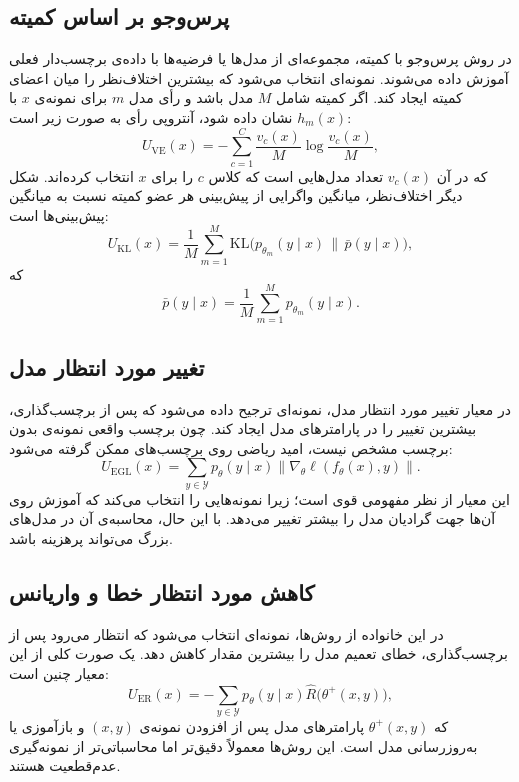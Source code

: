 \documentclass[12pt,a4paper,oneside]{report}
\newcommand{\cY}{\mathcal{Y}}
\newcommand{\KL}{\mathrm{KL}}
\begin{document}
\subsection{پرس‌وجو بر اساس کمیته}
در روش پرس‌وجو با کمیته، مجموعه‌ای از مدل‌ها یا فرضیه‌ها با داده‌ی برچسب‌دار فعلی آموزش داده می‌شوند. نمونه‌ای انتخاب می‌شود که بیشترین اختلاف‌نظر را میان اعضای کمیته ایجاد کند. اگر کمیته شامل $M$ مدل باشد و رأی مدل $m$ برای نمونه‌ی $x$ با $h_m(x)$ نشان داده شود، آنتروپی رأی به صورت زیر است:
\begin{equation}
U_{\mathrm{VE}}(x)= -\sum_{c=1}^{C}\frac{v_c(x)}{M}\log\frac{v_c(x)}{M},
\end{equation}
که در آن $v_c(x)$ تعداد مدل‌هایی است که کلاس $c$ را برای $x$ انتخاب کرده‌اند. شکل دیگر اختلاف‌نظر، میانگین واگرایی  از پیش‌بینی هر عضو کمیته نسبت به میانگین پیش‌بینی‌ها است:
\begin{equation}
U_{\mathrm{KL}}(x)=\frac{1}{M}\sum_{m=1}^{M}
\KL\Big(p_{\theta_m}(y\mid x)\,\big\|\,\bar p(y\mid x)\Big),
\end{equation}
که
\begin{equation}
\bar p(y\mid x)=\frac{1}{M}\sum_{m=1}^{M}p_{\theta_m}(y\mid x).
\end{equation}

\subsection{تغییر مورد انتظار مدل}
در معیار تغییر مورد انتظار مدل، نمونه‌ای ترجیح داده می‌شود که پس از برچسب‌گذاری، بیشترین تغییر را در پارامترهای مدل ایجاد کند. چون برچسب واقعی نمونه‌ی بدون برچسب مشخص نیست، امید ریاضی روی برچسب‌های ممکن گرفته می‌شود:
\begin{equation}
U_{\mathrm{EGL}}(x)=\sum_{y\in\cY}p_\theta(y\mid x)
\left\|\nabla_\theta \ell(f_\theta(x),y)\right\|.
\end{equation}
این معیار از نظر مفهومی قوی است؛ زیرا نمونه‌هایی را انتخاب می‌کند که آموزش روی آن‌ها جهت گرادیان مدل را بیشتر تغییر می‌دهد. با این حال، محاسبه‌ی آن در مدل‌های بزرگ می‌تواند پرهزینه باشد.

\subsection{کاهش مورد انتظار خطا و واریانس}
در این خانواده از روش‌ها، نمونه‌ای انتخاب می‌شود که انتظار می‌رود پس از برچسب‌گذاری، خطای تعمیم مدل را بیشترین مقدار کاهش دهد. یک صورت کلی از این معیار چنین است:
\begin{equation}
U_{\mathrm{ER}}(x)=
-\sum_{y\in\cY}p_\theta(y\mid x)
\widehat R\big(\theta^{+}(x,y)\big),
\end{equation}
که $\theta^{+}(x,y)$ پارامترهای مدل پس از افزودن نمونه‌ی $(x,y)$ و بازآموزی یا به‌روزرسانی مدل است. این روش‌ها معمولاً دقیق‌تر اما محاسباتی‌تر از نمونه‌گیری عدم‌قطعیت هستند.
\end{document}
